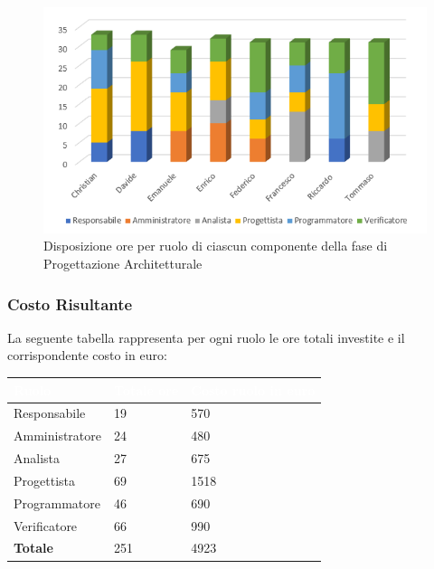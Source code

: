 \begin{figure}[h!]
	\centering
	\caption{Disposizione ore per ruolo di ciascun componente della fase di Progettazione Architetturale}
	\includegraphics[scale=3]{sezioni/Istogrammi/IstogrammaProgettArchitetturale.png}
\end{figure}


\subsubsection{Costo Risultante}
La seguente tabella rappresenta per ogni ruolo le ore totali investite e il corrispondente costo in euro:
{
\renewcommand{\arraystretch}{2}
\centering
\begin{table}[h]
\caption{Tabella del costo risultante della Progettazione Architetturale}
\begin{longtable}{ C{3cm} C{2cm} C{4cm}}
	\textcolor{white}{\textbf{Ruolo}} & 
	\textcolor{white}{\textbf{Totale ore}} & 
	\textcolor{white}{\textbf{Costo ruolo in euro}}\\	
\endhead
        
        Responsabile & 19 & 570 \\
        Amministratore & 24 & 480 \\
        Analista & 27 & 675 \\
        Progettista & 69 & 1518 \\
        Programmatore & 46 & 690 \\
        Verificatore & 66 & 990 \\
        \textbf{Totale} & 251 & 4923 \\	
        	
	\end{longtable}
\end{table}
}

